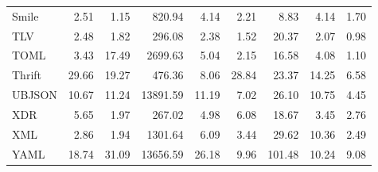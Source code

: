 \begin{tabular}{lrrrrrrrr}
Smile & 2.51 & 1.15 & 820.94 & 4.14 & 2.21 & 8.83 & 4.14 & 1.70 \\
TLV & 2.48 & 1.82 & 296.08 & 2.38 & 1.52 & 20.37 & 2.07 & 0.98 \\
TOML & 3.43 & 17.49 & 2699.63 & 5.04 & 2.15 & 16.58 & 4.08 & 1.10 \\
Thrift & 29.66 & 19.27 & 476.36 & 8.06 & 28.84 & 23.37 & 14.25 & 6.58 \\
UBJSON & 10.67 & 11.24 & 13891.59 & 11.19 & 7.02 & 26.10 & 10.75 & 4.45 \\
XDR & 5.65 & 1.97 & 267.02 & 4.98 & 6.08 & 18.67 & 3.45 & 2.76 \\
XML & 2.86 & 1.94 & 1301.64 & 6.09 & 3.44 & 29.62 & 10.36 & 2.49 \\
YAML & 18.74 & 31.09 & 13656.59 & 26.18 & 9.96 & 101.48 & 10.24 & 9.08 \\
\end{tabular}

